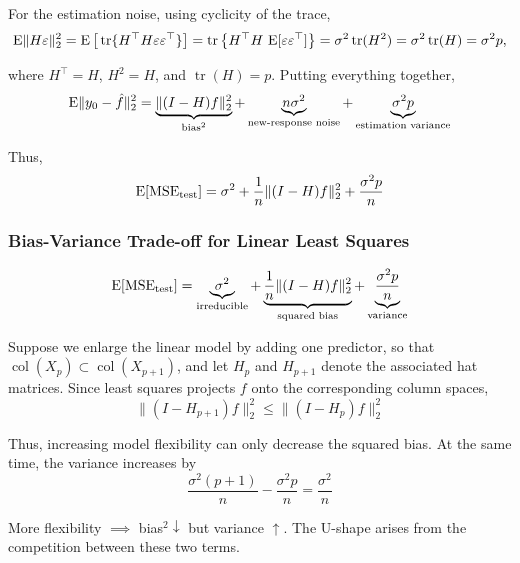 For the estimation noise, using cyclicity of the trace,
\begin{equation*}
    \operatorname{E}\lVert H\varepsilon \rVert_2^2 = \operatorname{E}\big[\operatorname{tr}\{H^\top H \varepsilon\varepsilon^\top\}\big] = \operatorname{tr}\big\{H^\top H\, \operatorname{E}[\varepsilon\varepsilon^\top]\big\} = \sigma^2\operatorname{tr}(H^2) = \sigma^2\operatorname{tr}(H) = \sigma^2 p,
\end{equation*}

where $H^\top=H$, $H^2=H$, and $\operatorname{tr}(H)=p$. Putting everything together,
\begin{equation*}
    \operatorname{E}\lVert y_0-\hat f \rVert_2^2 = \underbrace{\lVert (I-H)f \rVert_2^2}_{\text{bias}^2} + \underbrace{n\sigma^2}_{\text{new-response noise}} + \underbrace{\sigma^2 p}_{\text{estimation variance}}
\end{equation*}

Thus,
\begin{equation*}
    \operatorname{E}[\text{MSE}_{\text{test}}] = \sigma^2 + \frac{1}{n}\lVert (I-H)f \rVert_2^2 + \frac{\sigma^2 p}{n}
\end{equation*}

\subsubsection{Bias-Variance Trade-off for Linear Least Squares}
\begin{equation*}
    \operatorname{E}[\text{MSE}_{\text{test}}] = \underbrace{\sigma^2}_{\text{irreducible}} + \underbrace{\frac{1}{n}\lVert (I-H)f \rVert_2^2}_{\text{squared bias}} + \underbrace{\frac{\sigma^2 p}{n}}_{\text{variance}}
\end{equation*}

Suppose we enlarge the linear model by adding one predictor, so that $\operatorname{col}(X_p) \subset \operatorname{col}(X_{p+1})$, and let $H_p$ and $H_{p+1}$ denote the associated hat matrices. Since least squares projects $f$ onto the corresponding column spaces,
\begin{equation*}
    \lVert (I-H_{p+1})f \rVert_2^2 \leq \lVert (I-H_p)f \rVert_2^2
\end{equation*}

Thus, increasing model flexibility can only decrease the squared bias. At the same time, the variance increases by
\begin{equation*}
    \frac{\sigma^2(p+1)}{n} - \frac{\sigma^2 p}{n} = \frac{\sigma^2}{n}
\end{equation*}

More flexibility $\implies$ bias$^2\downarrow$ but variance $\uparrow$. The U-shape arises from the competition between these two terms.

